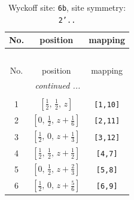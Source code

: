 \documentclass[fleqn,8pt]{jsarticle}
\begin{document}
\begin{longtable}{ccc}
\caption{Wyckoff site: {\tt 6b}, site symmetry: {\tt 2'..}}
 \\
 \hline \hline
No. & position & mapping \\ \hline \endfirsthead

\multicolumn{2}{l}{\tablename\ \thetable{}} \\
 \hline \hline
No. & position & mapping \\ \hline \endhead

 \hline \hline
\multicolumn{2}{r}{\footnotesize\it continued ...} \\ \endfoot

 \hline \hline
\multicolumn{2}{r}{} \\ \endlastfoot

1 & $\left[ \frac{1}{2},\, \frac{1}{2},\, z \right]$ & {\tt [1,10]} \\ \hline
2 & $\left[ 0,\, \frac{1}{2},\, z + \frac{1}{6} \right]$ & {\tt [2,11]} \\ \hline
3 & $\left[ \frac{1}{2},\, 0,\, z + \frac{1}{3} \right]$ & {\tt [3,12]} \\ \hline
4 & $\left[ \frac{1}{2},\, \frac{1}{2},\, z + \frac{1}{2} \right]$ & {\tt [4,7]} \\ \hline
5 & $\left[ 0,\, \frac{1}{2},\, z + \frac{2}{3} \right]$ & {\tt [5,8]} \\ \hline
6 & $\left[ \frac{1}{2},\, 0,\, z + \frac{5}{6} \right]$ & {\tt [6,9]} \\
\end{longtable}
\renewcommand{\arraystretch}{1.2}
\end{document}
